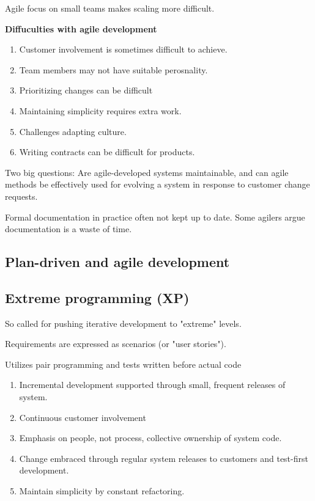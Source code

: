 \documentclass{article}
\begin{document}
Agile focus on small teams makes scaling more difficult.

\textbf{Diffuculties with agile development}
\begin{enumerate}
    \item Customer involvement is sometimes difficult to achieve.
    \item Team members may not have suitable perosnality.
    \item Prioritizing changes can be difficult
    \item Maintaining simplicity requires extra work.
    \item Challenges adapting culture.
    \item Writing contracts can be difficult for products.
\end{enumerate}

Two big questions: Are agile-developed systems maintainable, and can agile methods be effectively used for evolving a system in response to customer change requests.

Formal documentation in practice often not kept up to date.  Some agilers argue documentation is a waste of time.

\subsection{Plan-driven and agile development}


\subsection{Extreme programming (XP)}

So called for pushing iterative development to "extreme" levels.  

Requirements are expressed as scenarios (or "user stories").

Utilizes pair programming and tests written before actual code

\begin{enumerate}
    \item Incremental development supported through small, frequent releases of system.
    \item Continuous customer involvement
    \item Emphasis on people, not process, collective ownership of system code.
    \item Change embraced through regular system releases to customers and test-first development.
    \item Maintain simplicity by constant refactoring.
\end{enumerate}
\end{document}

